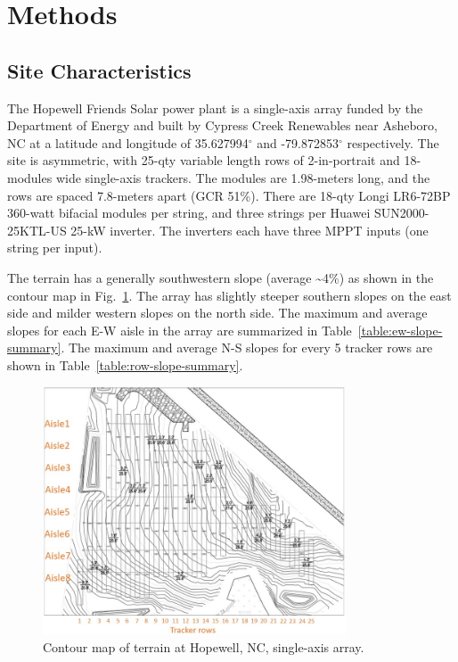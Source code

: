 \documentclass[conference]{IEEEtran}
\begin{document}
\section{Methods}

\subsection{Site Characteristics}

The Hopewell Friends Solar power plant is a single-axis array funded by the Department of Energy and built by Cypress Creek Renewables \cite{CypressCreekRenewables2019} near Asheboro, NC at a latitude and longitude of 35.627994$^\circ$ and -79.872853$^\circ$ respectively. The site is asymmetric, with 25-qty variable length rows of 2-in-portrait and 18-modules wide single-axis trackers. The modules are 1.98-meters long, and the rows are spaced 7.8-meters apart (GCR 51\%). There are 18-qty Longi LR6-72BP 360-watt bifacial modules per string, and three strings per Huawei SUN2000-25KTL-US 25-kW inverter. The inverters each have three MPPT inputs (one string per input).

The terrain has a generally southwestern slope (average \textasciitilde 4\%) as shown in the contour map in Fig.~\ref{fig:hopewell_contour_map}. The array has slightly steeper southern slopes on the east side and milder western slopes on the north side. The maximum and average slopes for each E-W aisle in the array are summarized in Table~\ref{table:ew-slope-summary}. The maximum and average N-S slopes for every 5 tracker rows are shown in Table~\ref{table:row-slope-summary}.

\begin{figure}[htbp]
\centerline{\includegraphics[width=9cm]{Hopewell_Civil_Base.jpg}}
\caption{Contour map of terrain at Hopewell, NC, single-axis array.}
\label{fig:hopewell_contour_map}
\end{figure}
\end{document}
